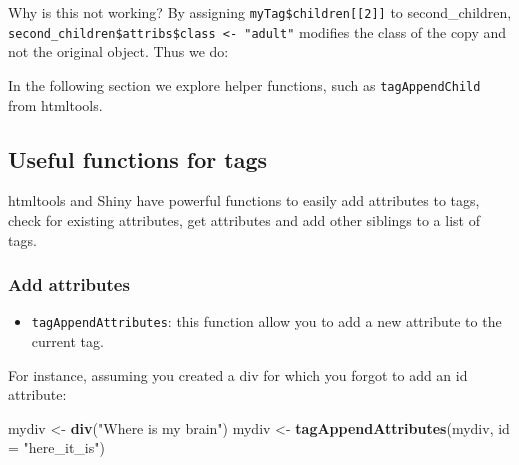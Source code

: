 \documentclass[]{book}
\newenvironment{Shaded}{\begin{snugshade}}{\end{snugshade}}
\newcommand{\DataTypeTok}[1]{\textcolor[rgb]{0.13,0.29,0.53}{#1}}
\newcommand{\DecValTok}[1]{\textcolor[rgb]{0.00,0.00,0.81}{#1}}
\newcommand{\KeywordTok}[1]{\textcolor[rgb]{0.13,0.29,0.53}{\textbf{#1}}}
\newcommand{\NormalTok}[1]{#1}
\newcommand{\OperatorTok}[1]{\textcolor[rgb]{0.81,0.36,0.00}{\textbf{#1}}}
\newcommand{\StringTok}[1]{\textcolor[rgb]{0.31,0.60,0.02}{#1}}
\providecommand{\tightlist}{%
  \setlength{\itemsep}{0pt}\setlength{\parskip}{0pt}}
\begin{document}
Why is this not working? By assigning \texttt{myTag\$children{[}{[}2{]}{]}} to second\_children, \texttt{second\_children\$attribs\$class\ \textless{}-\ "adult"} modifies the class of the copy and not the original object. Thus we do:

\begin{Shaded}
\end{Shaded}

In the following section we explore helper functions, such as \texttt{tagAppendChild} from htmltools.

\hypertarget{useful-functions-for-tags}{%
\subsection{Useful functions for tags}\label{useful-functions-for-tags}}

htmltools and Shiny have powerful functions to easily add attributes to tags, check for existing attributes, get attributes and add other siblings to a list of tags.

\hypertarget{add-attributes}{%
\subsubsection{Add attributes}\label{add-attributes}}

\begin{itemize}
\tightlist
\item
  \texttt{tagAppendAttributes}: this function allow you to add a new attribute to the current tag.
\end{itemize}

For instance, assuming you created a div for which you forgot to add an id attribute:

\begin{Shaded}
\begin{Highlighting}[]
\NormalTok{mydiv <-}\StringTok{ }\KeywordTok{div}\NormalTok{(}\StringTok{"Where is my brain"}\NormalTok{)}
\NormalTok{mydiv <-}\StringTok{ }\KeywordTok{tagAppendAttributes}\NormalTok{(mydiv, }\DataTypeTok{id =} \StringTok{"here_it_is"}\NormalTok{)}
\end{Highlighting}
\end{Shaded}
\end{document}
